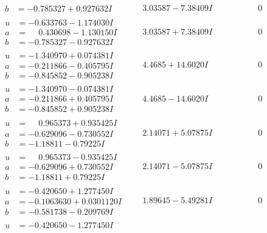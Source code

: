 \documentclass[1p]{elsarticle_modified}
\theoremstyle{definition}
\begin{document}
$$\begin{array}{c|c|c}
\begin{aligned}
b &= -0.785327 + 0.927632 I\end{aligned}
 & \phantom{-}3.03587 - 7.38409 I & \phantom{-0.000000 } 0 \\ \hline\begin{aligned}
u &= -0.633763 - 1.174030 I \\
a &= \phantom{-}0.430698 - 1.130150 I \\
b &= -0.785327 - 0.927632 I\end{aligned}
 & \phantom{-}3.03587 + 7.38409 I & \phantom{-0.000000 } 0 \\ \hline\begin{aligned}
u &= -1.340970 + 0.074381 I \\
a &= -0.211866 - 0.405795 I \\
b &= -0.845852 - 0.905238 I\end{aligned}
 & \phantom{-}4.4685 + 14.6020 I & \phantom{-0.000000 } 0 \\ \hline\begin{aligned}
u &= -1.340970 - 0.074381 I \\
a &= -0.211866 + 0.405795 I \\
b &= -0.845852 + 0.905238 I\end{aligned}
 & \phantom{-}4.4685 - 14.6020 I & \phantom{-0.000000 } 0 \\ \hline\begin{aligned}
u &= \phantom{-}0.965373 + 0.935425 I \\
a &= -0.629096 - 0.730552 I \\
b &= -1.18811 - 0.79225 I\end{aligned}
 & \phantom{-}2.14071 + 5.07875 I & \phantom{-0.000000 } 0 \\ \hline\begin{aligned}
u &= \phantom{-}0.965373 - 0.935425 I \\
a &= -0.629096 + 0.730552 I \\
b &= -1.18811 + 0.79225 I\end{aligned}
 & \phantom{-}2.14071 - 5.07875 I & \phantom{-0.000000 } 0 \\ \hline\begin{aligned}
u &= -0.420650 + 1.277450 I \\
a &= -0.1063630 + 0.0301120 I \\
b &= -0.581738 - 0.209769 I\end{aligned}
 & \phantom{-}1.89645 - 5.49281 I & \phantom{-0.000000 } 0 \\ \hline\begin{aligned}
u &= -0.420650 - 1.277450 I \\

\end{aligned}
\end{array}$$
\end{document}
